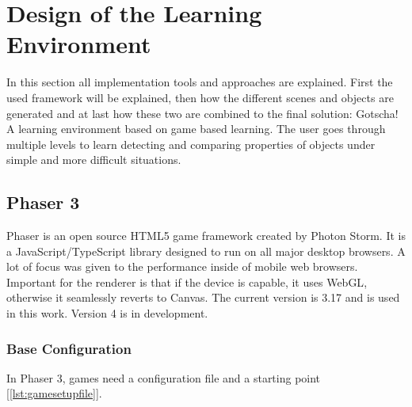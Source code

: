
\chapter{Design of the Learning Environment}\label{ch:design}

In this section all implementation tools and approaches are explained.
First the used framework will be explained, then how the different scenes and objects are generated and
at last how these two are combined to the final solution: Gotscha! A learning environment based on game based learning.
The user goes through multiple levels to learn detecting and comparing properties of objects
under simple and more difficult situations.

\section{Phaser 3}\label{sec:phaser-3}

Phaser\cite{phaser} is an open source HTML5\cite{html5} game framework created by Photon Storm\cite{phaser}.
It is a JavaScript/TypeScript\cite{typescript} library designed to run on all major desktop browsers.
A lot of focus was given to the performance inside of mobile web browsers.
Important for the renderer is that if the device is capable, it uses WebGL\cite{webgl}, otherwise it seamlessly reverts to Canvas\cite{canvas}.
The current version is 3.17 and is used in this work. Version 4 is in development.

\subsection{Base Configuration}\label{subsec:base-configuration}
In Phaser 3, games need a configuration file and a starting point [\ref{lst:gamesetupfile}].

